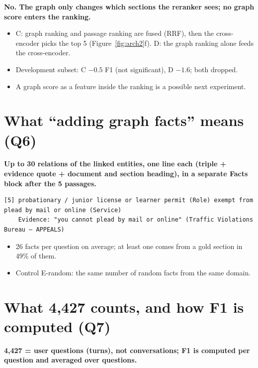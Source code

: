 \documentclass[11pt,a4paper]{article}
\begin{document}
\textbf{No. The graph only changes which sections the reranker sees; no graph score enters the
ranking.}

\begin{itemize}
\item C: graph ranking and passage ranking are fused (RRF), then the cross-encoder picks the top 5
  (Figure~\ref{fig:arch2}f). D: the graph ranking alone feeds the cross-encoder.
\item Development subset: C $-0.5$ F1 (not significant), D $-1.6$; both dropped.
\item A graph score as a feature inside the ranking is a possible next experiment.
\end{itemize}

\section{What ``adding graph facts'' means (Q6)}\label{sec:facts}

\textbf{Up to 30 relations of the linked entities, one line each (triple + evidence quote +
document and section heading), in a separate Facts block after the 5 passages.}

\begin{lstlisting}[frame=none,backgroundcolor=\color{white}]
[5] probationary / junior license or learner permit (Role) exempt from plead by mail or online (Service)
    Evidence: "you cannot plead by mail or online" (Traffic Violations Bureau — APPEALS)
\end{lstlisting}

\begin{itemize}
\item 26 facts per question on average; at least one comes from a gold section in 49\% of them.
\item Control E-random: the same number of random facts from the same domain.
\end{itemize}

\section{What 4,427 counts, and how F1 is computed (Q7)}\label{sec:f1}

\textbf{4,427 = user questions (turns), not conversations; F1 is computed per question and
averaged over questions.}
\end{document}
